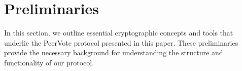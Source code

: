 \documentclass[runningheads]{llncs}
\begin{document}
\newcommand{\GuardianSetOf}[1]{\ensuremath{\mathbb{G}_{#1}}}
\newcommand{\TotalA}{\ensuremath{C1}}
\newcommand{\TotalB}{\ensuremath{C2}}
\newcommand{\BallotA}[1]{\ensuremath{C1_{#1}}}
\newcommand{\BallotB}[1]{\ensuremath{C2_{#1}}}

\newcommand{\G}{\ensuremath{G}}


\newcommand{\SharePartialDecryptionFromTo}[2]{\ensuremath{[\mathrm{PD}_{#1}]_{#2}}}

\newcommand{\PartialDecryptionFrom}[1]{\ensuremath{\mathrm{PD}_{#1}}}

\section{Preliminaries}
In this section, we outline essential cryptographic concepts and tools that underlie the PeerVote protocol presented in this paper. These preliminaries provide the necessary background for understanding the structure and functionality of our protocol.
\end{document}
